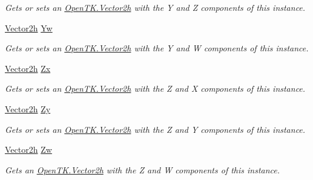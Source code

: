 \begin{DoxyCompactItemize}
\begin{DoxyCompactList}\small\item\em Gets or sets an \hyperlink{struct_open_t_k_1_1_vector2h}{Open\-T\-K.\-Vector2h} with the Y and Z components of this instance. \end{DoxyCompactList}\item 
\hyperlink{struct_open_t_k_1_1_vector2h}{Vector2h} \hyperlink{struct_open_t_k_1_1_vector4h_a529350961d98235eedb221afc88a775b}{Yw}
\begin{DoxyCompactList}\small\item\em Gets or sets an \hyperlink{struct_open_t_k_1_1_vector2h}{Open\-T\-K.\-Vector2h} with the Y and W components of this instance. \end{DoxyCompactList}\item 
\hyperlink{struct_open_t_k_1_1_vector2h}{Vector2h} \hyperlink{struct_open_t_k_1_1_vector4h_ac928e48f712449f994d57f6e6f1886ab}{Zx}
\begin{DoxyCompactList}\small\item\em Gets or sets an \hyperlink{struct_open_t_k_1_1_vector2h}{Open\-T\-K.\-Vector2h} with the Z and X components of this instance. \end{DoxyCompactList}\item 
\hyperlink{struct_open_t_k_1_1_vector2h}{Vector2h} \hyperlink{struct_open_t_k_1_1_vector4h_a84a12f9550c2b7b6997c4c8c82d7a614}{Zy}
\begin{DoxyCompactList}\small\item\em Gets or sets an \hyperlink{struct_open_t_k_1_1_vector2h}{Open\-T\-K.\-Vector2h} with the Z and Y components of this instance. \end{DoxyCompactList}\item 
\hyperlink{struct_open_t_k_1_1_vector2h}{Vector2h} \hyperlink{struct_open_t_k_1_1_vector4h_a07a710f867a88adaceeb17282f683d78}{Zw}
\begin{DoxyCompactList}\small\item\em Gets an \hyperlink{struct_open_t_k_1_1_vector2h}{Open\-T\-K.\-Vector2h} with the Z and W components of this instance. \end{DoxyCompactList}\item 

\end{DoxyCompactItemize}
